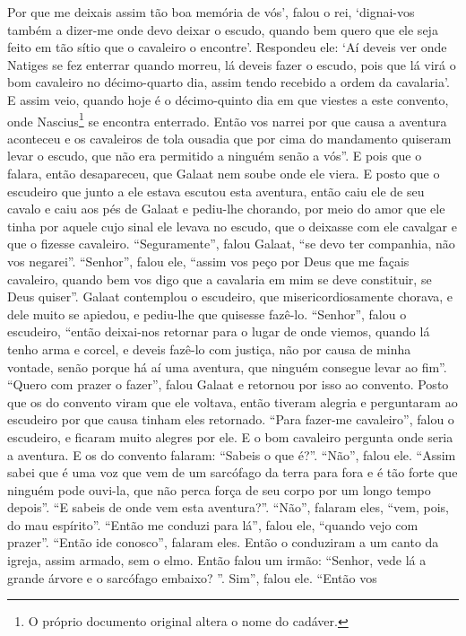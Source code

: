 Por que me deixais assim tão boa memória de vós’, falou o rei, ‘dignai-vos
também a dizer-me onde devo deixar o escudo, quando bem quero que ele seja
feito em tão sítio que o cavaleiro o encontre’. Respondeu ele: ‘Aí deveis ver
onde Natiges se fez enterrar quando morreu, lá deveis fazer o escudo, pois que
lá virá o bom cavaleiro no décimo-quarto dia, assim tendo recebido a ordem da
cavalaria’. E assim veio, quando hoje é o décimo-quinto dia em que viestes a
este convento, onde Nascius\footnote{ O próprio documento original altera o
nome do cadáver.}  se encontra enterrado. Então vos narrei por que
causa a aventura aconteceu e os cavaleiros de tola ousadia que por cima do
mandamento quiseram levar o escudo, que não era permitido a ninguém senão a
vós”. E pois que o falara, então desapareceu, que Galaat nem
soube onde ele viera. E posto que o escudeiro que junto a ele estava escutou
esta aventura, então caiu ele de seu cavalo e caiu aos pés de Galaat e
pediu-lhe chorando, por meio do amor que ele tinha por aquele cujo sinal ele
levava no escudo, que o deixasse com ele cavalgar e que o fizesse cavaleiro.
“Seguramente”, falou Galaat, “se devo ter companhia, não vos negarei”.
“Senhor”, falou ele, “assim vos peço por Deus que me façais cavaleiro, quando
bem vos digo que a cavalaria em mim se deve constituir, se Deus quiser”. Galaat
contemplou o escudeiro, que misericordiosamente chorava, e dele muito se
apiedou, e pediu-lhe que quisesse fazê-lo. “Senhor”, falou o escudeiro, “então
deixai-nos retornar para o lugar de onde viemos, quando lá tenho arma e corcel,
e deveis fazê-lo com justiça, não por causa de minha vontade, senão porque há
aí uma aventura, que ninguém consegue levar ao fim”. “Quero com prazer o
fazer”, falou Galaat e retornou por isso ao convento. Posto que os do convento
viram que ele voltava, então tiveram alegria e perguntaram ao escudeiro por que
causa tinham eles retornado. “Para fazer-me cavaleiro”, falou o escudeiro, e
ficaram muito alegres por ele. E o bom cavaleiro pergunta onde seria a
aventura. E os do convento falaram: “Sabeis o que é?”. “Não”, falou ele. “Assim
sabei que é uma voz que vem de um sarcófago da terra para fora e é tão forte
que ninguém pode ouvi-la, que não perca força de seu corpo por um longo tempo
depois”. “E sabeis de onde vem esta aventura?”. “Não”, falaram eles, “vem,
pois, do mau espírito”. “Então me conduzi para lá”, falou ele, “quando vejo com
prazer”. “Então ide conosco”, falaram eles. Então o conduziram a um canto da
igreja, assim armado, sem o elmo. Então falou um irmão: “Senhor, vede lá a
grande árvore e o sarcófago embaixo? ”. Sim”,  falou ele. “Então vos
